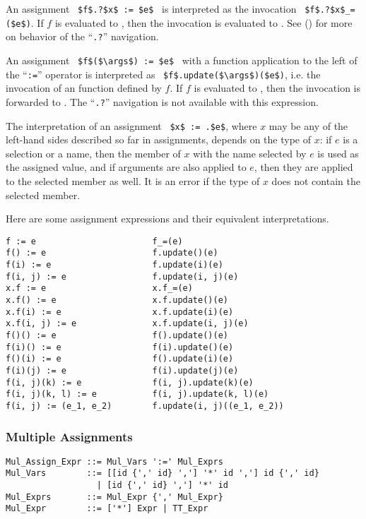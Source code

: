 An assignment ~\lstinline!$f$.?$x$ := $e$!~ is interpreted as the invocation ~\lstinline!$f$.?$x$_=($e$)!. If $f$ is evaluated to , then the invocation is evaluated to . See () for more on behavior of the ``\lstinline!.?!'' navigation. 

An assignment ~\lstinline!$f$($\args$) := $e$!~ with a function application to the left of the ``\lstinline!:=!'' operator is interpreted as ~\lstinline!$f$.update($\args$)($e$)!, i.e. the invocation of an  function defined by $f$. If $f$ is evaluated to , then the invocation is forwarded to . The ``\lstinline!.?!'' navigation is not available with this expression. 

The interpretation of an assignment ~\lstinline!$x$ := .$e$!, where $x$ may be any of the left-hand sides described so far in assignments, depends on the type of $x$: if $e$ is a selection or a name, then the member of $x$ with the name selected by $e$ is used as the assigned value, and if arguments are also applied to $e$, then they are applied to the selected member as well. It is an error if the type of $x$ does not contain the selected member. 

\example Here are some assignment expressions and their equivalent interpretations. 
\begin{lstlisting}
f := e                       f_=(e)
f() := e                     f.update()(e)
f(i) := e                    f.update(i)(e)
f(i, j) := e                 f.update(i, j)(e)
x.f := e                     x.f_=(e)
x.f() := e                   x.f.update()(e)
x.f(i) := e                  x.f.update(i)(e)
x.f(i, j) := e               x.f.update(i, j)(e)
f()() := e                   f().update()(e)
f(i)() := e                  f(i).update()(e)
f()(i) := e                  f().update(i)(e)
f(i)(j) := e                 f(i).update(j)(e)
f(i, j)(k) := e              f(i, j).update(k)(e)
f(i, j)(k, l) := e           f(i, j).update(k, l)(e)
f(i, j) := (e_1, e_2)        f.update(i, j)((e_1, e_2))
\end{lstlisting}






\subsubsection{Multiple Assignments}
\label{sec:multiple-assignments}

\syntax\begin{lstlisting}
Mul_Assign_Expr ::= Mul_Vars ':=' Mul_Exprs
Mul_Vars        ::= [[id {',' id} ','] '*' id ','] id {',' id}
                  | [id {',' id} ','] '*' id
Mul_Exprs       ::= Mul_Expr {',' Mul_Expr}
Mul_Expr        ::= ['*'] Expr | TT_Expr
\end{lstlisting}


